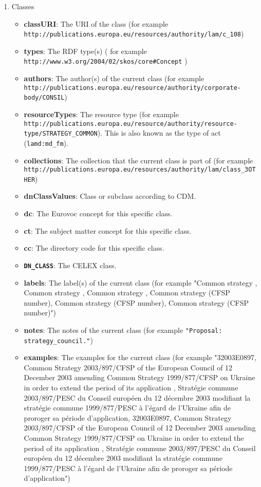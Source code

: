 \begin{enumerate}
\begin{itemize}
	\end{itemize}
	\item Classes
	\begin{itemize}
	\item \textbf{classURI}: The URI of the class (for example \lstinline!http://publications.europa.eu/resources/authority/lam/c_108!)
	\item \textbf{types}: The RDF type(s) ( for example \lstinline!http://www.w3.org/2004/02/skos/core#Concept! )
	\item \textbf{authors}: The author(s) of the current class (for example \lstinline!http://publications.europa.eu/resource/authority/corporate-body/CONSIL!)
	\item \textbf{resourceTypes}: The resource type (for example \lstinline!http://publications.europa.eu/resource/authority/resource-type/STRATEGY_COMMON!). This is also known as the type of act (\lstinline!lamd:md_fm!).
	\item \textbf{collections}: The collection that the current class is part of (for example \lstinline!http://publications.europa.eu/resources/authority/lam/class_3OTHER!)
	\item \textbf{dnClassValues}: Class or subclass according to CDM.
	\item \textbf{dc}: The Eurovoc concept for this specific class.
	\item \textbf{ct}: The subject matter concept for this specific class.
	\item \textbf{cc}: The directory code for this specific class.
	\item \textbf{\lstinline!DN_CLASS!}: The CELEX class.
	\item \textbf{labels}: The label(s) of the current class (for example "Common strategy , Common strategy , Common strategy , Common strategy (CFSP number), Common strategy (CFSP number), Common strategy (CFSP number)")
	\item \textbf{notes}: The notes of the current class (for example \lstinline!"Proposal: strategy_council."!)
	\item \textbf{examples}: The examples for the current class (for example "32003E0897, Common Strategy 2003/897/CFSP of the European Council of 12 December 2003 amending Common Strategy 1999/877/CFSP on Ukraine in order to extend the period of its application , Stratégie commune 2003/897/PESC du Conseil européen du 12 décembre 2003 modifiant la stratégie commune 1999/877/PESC à l'égard de l'Ukraine afin de proroger sa période d'application, 32003E0897, Common Strategy 2003/897/CFSP of the European Council of 12 December 2003 amending Common Strategy 1999/877/CFSP on Ukraine in order to extend the period of its application , Stratégie commune 2003/897/PESC du Conseil européen du 12 décembre 2003 modifiant la stratégie commune 1999/877/PESC à l'égard de l'Ukraine afin de proroger sa période d'application")

\end{itemize}
\end{enumerate}
